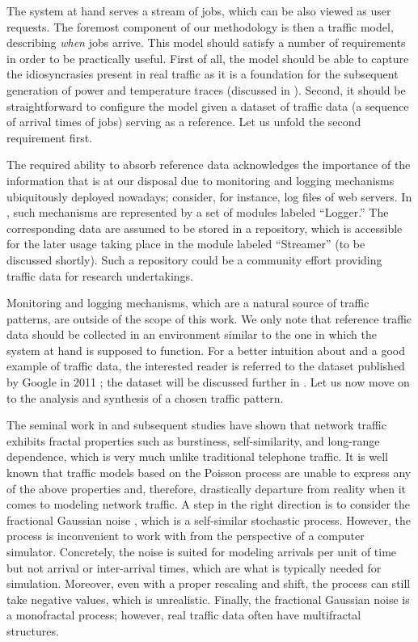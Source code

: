 The system at hand serves a stream of jobs, which can be also viewed as user
requests. The foremost component of our methodology is then a traffic model,
describing \emph{when} jobs arrive. This model should satisfy a number of
requirements in order to be practically useful. First of all, the model should
be able to capture the idiosyncrasies present in real traffic as it is a
foundation for the subsequent generation of power and temperature traces
(discussed in ). Second, it should be straightforward to
configure the model given a dataset of traffic data (a sequence of arrival times
of jobs) serving as a reference. Let us unfold the second requirement first.

The required ability to absorb reference data acknowledges the importance of the
information that is at our disposal due to monitoring and logging mechanisms
ubiquitously deployed nowadays; consider, for instance, log files of web
servers. In , such mechanisms are represented by a set of
modules labeled ``Logger.'' The corresponding data are assumed to be stored in a
repository, which is accessible for the later usage taking place in the module
labeled ``Streamer'' (to be discussed shortly). Such a repository could be a
community effort providing traffic data for research undertakings.

Monitoring and logging mechanisms, which are a natural source of traffic
patterns, are outside of the scope of this work. We only note that reference
traffic data should be collected in an environment similar to the one in which
the system at hand is supposed to function. For a better intuition about and a
good example of traffic data, the interested reader is referred to the dataset
published by Google in 2011 \cite{google}; the dataset will be discussed further
in . Let us now move on to the analysis and synthesis of a chosen
traffic pattern.

The seminal work in \cite{leland1994} and subsequent studies have shown that
network traffic exhibits fractal properties such as burstiness, self-similarity,
and long-range dependence, which is very much unlike traditional telephone
traffic. It is well known that traffic models based on the Poisson process
\cite{lifshits2014} are unable to express any of the above properties and,
therefore, drastically departure from reality when it comes to modeling network
traffic. A step in the right direction is to consider the fractional Gaussian
noise \cite{lifshits2014}, which is a self-similar stochastic process. However,
the process is inconvenient to work with from the perspective of a computer
simulator. Concretely, the noise is suited for modeling arrivals per unit of
time but not arrival or inter-arrival times, which are what is typically needed
for simulation. Moreover, even with a proper rescaling and shift, the process
can still take negative values, which is unrealistic. Finally, the fractional
Gaussian noise is a monofractal process; however, real traffic data often have
multifractal structures.

